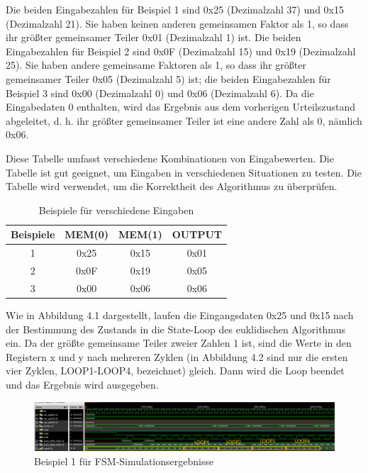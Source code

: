 \noindent Die beiden Eingabezahlen für Beispiel 1 sind 0x25 (Dezimalzahl 37) und 0x15 (Dezimalzahl 21). Sie haben keinen anderen gemeinsamen Faktor als 1, so dass ihr größter gemeinsamer Teiler 0x01 (Dezimalzahl 1) ist. Die beiden Eingabezahlen für Beispiel 2 sind 0x0F (Dezimalzahl 15) und 0x19 (Dezimalzahl 25). Sie haben andere gemeinsame Faktoren als 1, so dass ihr größter gemeinsamer Teiler 0x05 (Dezimalzahl 5) ist; die beiden Eingabezahlen für Beispiel 3 sind 0x00 (Dezimalzahl 0) und 0x06 (Dezimalzahl 6). Da die Eingabedaten 0 enthalten, wird das Ergebnis aus dem vorherigen Urteilszustand abgeleitet, d. h. ihr größter gemeinsamer Teiler ist eine andere Zahl als 0, nämlich 0x06.

\vspace{\baselineskip}

\noindent Diese Tabelle umfasst verschiedene Kombinationen von Eingabewerten. Die Tabelle ist gut geeignet, um Eingaben in verschiedenen Situationen zu testen. Die Tabelle wird verwendet, um die Korrektheit des Algorithmus zu überprüfen.

\begin{table}[H]
    \centering
    \caption{Beispiele für verschiedene Eingaben}
    \begin{tabular}{|c|c|c|c|}
      \hline
      Beispiele & MEM(0) & MEM(1) & OUTPUT \\ \hline
      1         & 0x25   & 0x15   & 0x01   \\ \hline
      2         & 0x0F   & 0x19   & 0x05   \\ \hline
      3         & 0x00   & 0x06   & 0x06   \\ \hline

    \end{tabular}
\end{table}

\noindent Wie in Abbildung 4.1 dargestellt, laufen die Eingangsdaten 0x25 und 0x15 nach der Bestimmung des Zustands in die State-Loop des euklidischen Algorithmus ein. Da der größte gemeinsame Teiler zweier Zahlen 1 ist, sind die Werte in den Registern x und y nach mehreren Zyklen (in Abbildung 4.2 sind nur die ersten vier Zyklen, LOOP1-LOOP4, bezeichnet) gleich. Dann wird die Loop beendet und das Ergebnis wird ausgegeben.

\begin{figure}[H]
    \centering
    \includegraphics[width=1.0\textwidth]{images/bs1.png}
    \caption[Beispiel 1 für FSM-Simulationsergebnisse]{Beispiel 1 für FSM-Simulationsergebnisse}
    \label{fig:bs1}
\end{figure}

